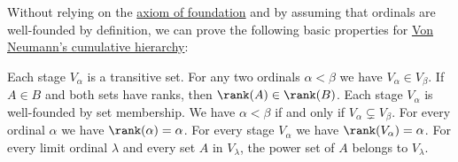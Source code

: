 \begin{proposition}\label{thm:def:cumulative_hierarchy}
  Without relying on the \hyperref[def:zfc/foundation]{axiom of foundation} and by assuming that ordinals are well-founded by definition, we can prove the following basic properties for \hyperref[def:cumulative_hierarchy]{Von Neumann's cumulative hierarchy}:
  \begin{thmenum}
     Each stage \( V_\alpha \) is a transitive set.
     For any two ordinals \( \alpha < \beta \) we have \( V_\alpha \in V_\beta \).
     If \( A \in B \) and both sets have ranks, then \( \rank(A) \in \rank(B) \).
     Each stage \( V_\alpha \) is well-founded by set membership.
     We have \( \alpha < \beta \) if and only if \( V_\alpha \subsetneq V_\beta \).
     For every ordinal \( \alpha \) we have \( \rank(\alpha) = \alpha \).
     For every stage \( V_\alpha \) we have \( \rank(V_\alpha) = \alpha \).
     For every limit ordinal \( \lambda \) and every set \( A \) in \( V_\lambda \), the power set of \( A \) belongs to \( V_\lambda \).
  \end{thmenum}
\end{proposition}
